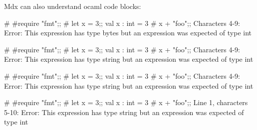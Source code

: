 Mdx can also understand ocaml code blocks:

\begin{ocaml}
# #require "fmt";;
# let x = 3;;
val x : int = 3
# x + "foo";;
Characters 4-9:
Error: This expression has type bytes but an expression was expected of type
         int
\end{ocaml}

\begin{ocaml}
# #require "fmt";;
# let x = 3;;
val x : int = 3
# x + "foo";;
Characters 4-9:
Error: This expression has type string but an expression was expected of type
         int
\end{ocaml}

\begin{ocaml}
# #require "fmt";;
# let x = 3;;
val x : int = 3
# x + "foo";;
Characters 4-9:
Error: This expression has type string but an expression was expected of type
         int
\end{ocaml}

\begin{ocaml}
# #require "fmt";;
# let x = 3;;
val x : int = 3
# x + "foo";;
Line 1, characters 5-10:
Error: This expression has type string but an expression was expected of type
         int
\end{ocaml}
